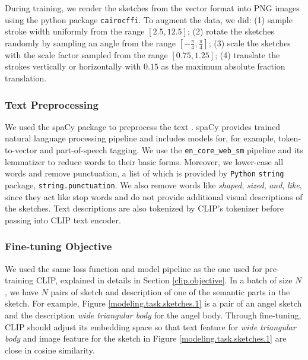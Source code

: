 During training, we render the sketches from the vector format into PNG images using the python package \texttt{cairocffi}. To augment the data, we did: (1) sample stroke width uniformly from the range $[2.5,12.5]$; (2) rotate the sketches randomly by sampling an angle from the range $[-\frac{\pi}{4}, \frac{\pi}{4}]$; (3) scale the sketches with the scale factor sampled from the range $[0.75, 1.25]$; (4) translate the strokes vertically or horizontally with $0.15$ as the maximum absolute fraction translation.   

\subsubsection*{Text Preprocessing} \label{text.preprocess}
We used the spaCy package to preprocess the text \citep{spacy2}. spaCy provides trained natural language processing pipeline and includes models for, for example, token-to-vector and part-of-speech tagging. We use the \texttt{en\_core\_web\_sm} pipeline and its lemmatizer to reduce words to their basic forms. Moreover, we lower-case all words and remove punctuation, a list of which is provided by \texttt{Python} \texttt{string} package, \texttt{string.punctuation}. We also remove words like \textit{shaped}, \textit{sized}, \textit{and}, \textit{like}, since they act like stop words and do not provide additional visual descriptions of the sketches. Text descriptions are also tokenized by CLIP's tokenizer before passing into CLIP text encoder.     

\subsubsection*{Fine-tuning Objective} \label{finetune.objective}
We used the same loss function and model pipeline as the one used for pre-training CLIP, explained in details in Section \ref{clip.objective}. 
In a batch of size $N$, we have $N$ pairs of sketch and description of one of the semantic parts in the sketch. For example, Figure \ref{modeling.task.sketches.1} is a pair of an angel sketch and the description \textit{wide triangular body} for the angel body.
Through fine-tuning, CLIP should adjust its embedding space so that text feature for \textit{wide triangular body} and image feature for the sketch in Figure \ref{modeling.task.sketches.1} are close in cosine similarity.  

